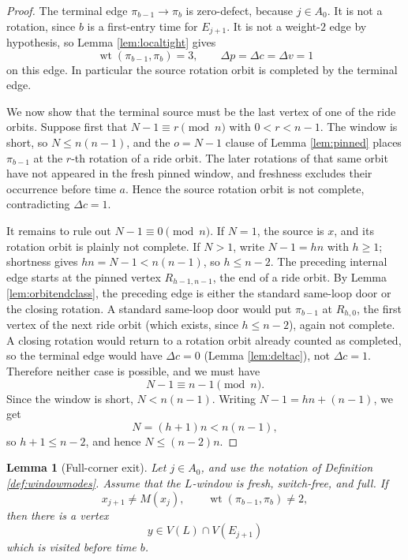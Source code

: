 \documentclass[11pt]{article}
\newtheorem{lemma}[theorem]{Lemma}
\DeclareMathOperator{\wt}{wt}
\begin{document}
\begin{proof}
The terminal edge \(\pi_{b-1}\to\pi_b\) is zero-defect, because \(j\in A_0\).  It is not a
rotation, since \(b\) is a first-entry time for \(E_{j+1}\).  It is not a weight-\(2\) edge by
hypothesis, so Lemma \ref{lem:localtight} gives
\[
  \wt(\pi_{b-1},\pi_b)=3,\qquad
  \Delta p=\Delta c=\Delta v=1
\]
on this edge.  In particular the source rotation orbit is completed by the terminal edge.

We now show that the terminal source must be the last vertex of one of the ride orbits.  Suppose
first that \(N-1\equiv r\pmod n\) with \(0<r<n-1\).  The window is short, so \(N\le n(n-1)\),
and the \(o=N-1\) clause of Lemma \ref{lem:pinned} places \(\pi_{b-1}\) at the \(r\)-th rotation
of a ride orbit.  The later rotations of that same
orbit have not appeared in the fresh pinned window, and freshness excludes their occurrence before
time \(a\).  Hence the source rotation orbit is not complete, contradicting \(\Delta c=1\).

It remains to rule out \(N-1\equiv0\pmod n\).  If \(N=1\), the source is \(x\), and its rotation
orbit is plainly not complete.  If \(N>1\), write \(N-1=hn\) with \(h\ge1\); shortness gives
\(hn=N-1<n(n-1)\), so \(h\le n-2\).  The preceding internal edge starts at the pinned vertex
\(R_{h-1,n-1}\), the end of a ride orbit.  By Lemma \ref{lem:orbitendclass}, the preceding edge
is either the standard same-loop door or the closing rotation.  A standard same-loop door would
put \(\pi_{b-1}\) at \(R_{h,0}\), the first vertex of the next ride orbit (which exists, since
\(h\le n-2\)), again not complete.  A closing rotation would return to a rotation
orbit already counted as completed, so the terminal edge would have \(\Delta c=0\)
(Lemma \ref{lem:deltac}), not
\(\Delta c=1\).  Therefore neither case is possible, and we must have
\[
  N-1\equiv n-1\pmod n .
\]
Since the window is short, \(N<n(n-1)\).  Writing \(N-1=hn+(n-1)\), we get
\[
  N=(h+1)n<n(n-1),
\]
so \(h+1\le n-2\), and hence \(N\le(n-2)n\).
\end{proof}

\begin{lemma}[Full-corner exit]\label{lem:cornerexit}
Let \(j\in A_0\), and use the notation of Definition \ref{def:windowmodes}.  Assume that the
\(L\)-window is fresh, switch-free, and full.  If
\[
  x_{j+1}\ne M(x_j),\qquad \wt(\pi_{b-1},\pi_b)\ne2,
\]
then there is a vertex
\[
  y\in V(L)\cap V(E_{j+1})
\]
which is visited before time \(b\).
\end{lemma}
\end{document}
